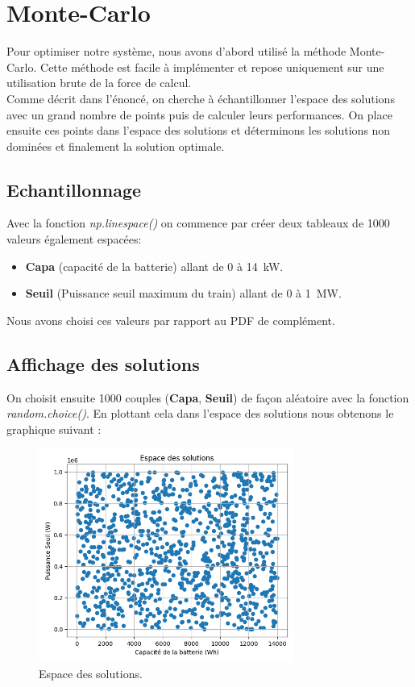 \documentclass[11pt, a4paper, oneside, portrait]{report}
\begin{document}
    \section*{Monte-Carlo}
        Pour optimiser notre système, nous avons d'abord utilisé la méthode Monte-Carlo. Cette méthode est facile à implémenter et repose uniquement sur une utilisation brute de la force de calcul.\\
        
        Comme décrit dans l'énoncé, on cherche à échantillonner l’espace des solutions avec un grand nombre de points puis de calculer leurs performances. On place ensuite ces points dans l'espace des solutions et déterminons les solutions non dominées et finalement la solution optimale.

        \subsection*{Echantillonnage}
            Avec la fonction \textit{np.linespace()} on commence par créer deux tableaux de 1000 valeurs également espacées:
            \begin{itemize}
                \item \textbf{Capa} (capacité de la batterie) allant de 0 à 14~kW.
                \item \textbf{Seuil} (Puissance seuil maximum du train) allant de 0 à 1~MW.
            \end{itemize}
            
            Nous avons choisi ces valeurs par rapport au PDF de complément.

        \subsection*{Affichage des solutions}
            On choisit ensuite 1000 couples (\textbf{Capa}, \textbf{Seuil}) de façon aléatoire avec la fonction \textit{random.choice()}. En plottant cela dans l'espace des solutions nous obtenons le graphique suivant :

            \begin{figure}[H]
                \centering
                \includegraphics[height=7cm]{espace_solution.png}
                \caption{Espace des solutions.}
            \end{figure}
\end{document}
